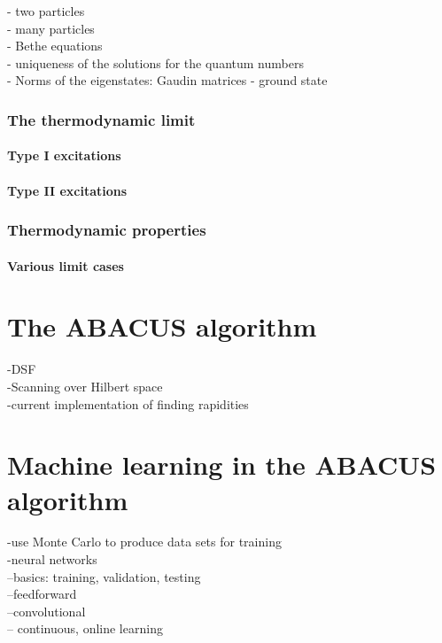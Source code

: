 \documentclass[11pt, a4paper]{report} %
\begin{document}
- two particles \\
- many particles\\
- Bethe equations\\
- uniqueness of the solutions for the quantum numbers\\
- Norms of the eigenstates: Gaudin matrices
- ground state

\subsection{The thermodynamic limit}

\subsubsection{Type I excitations}

\subsubsection{Type II excitations}

\subsection{Thermodynamic properties}

\subsubsection{Various limit cases}






\chapter{The ABACUS algorithm}

-DSF\\
-Scanning over Hilbert space\\
-current implementation of finding rapidities\\





\chapter{Machine learning in the ABACUS algorithm}

-use Monte Carlo to produce data sets for training\\
-neural networks\\
--basics: training, validation, testing\\
--feedforward\\
--convolutional\\
-- continuous, online learning
\end{document}
